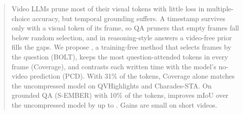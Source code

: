 \begin{abstract}
Video LLMs prune most of their visual tokens with little loss in multiple-choice accuracy, but temporal grounding
suffers. A timestamp survives only with a visual token of its frame, so QA pruners that empty frames fall below random
selection, and in reasoning-style answers a video-free prior fills the gaps. We propose \method, a training-free method
that selects frames by the question (BOLT), keeps the most question-attended tokens in every frame (Coverage), and
contrasts each written time with the model's no-video prediction (PCD). With 31\% of the tokens, Coverage alone matches
the uncompressed model on QVHighlights and Charades-STA. On grounded QA (S-EMBER) with 10\% of the tokens, \method
improves mIoU over the uncompressed model by up to . Gains are small on short videos.
\end{abstract}
